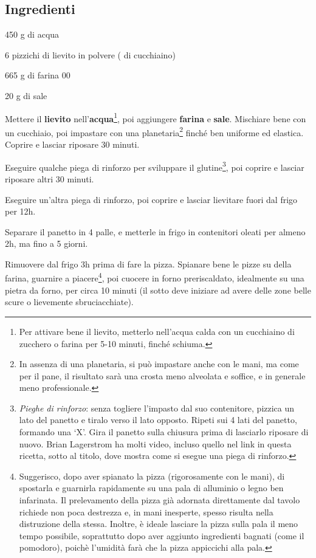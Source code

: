 \newpage
{} \label{pizza_napolitana}

\subsection*{Ingredienti}
\begin{ingredients}
	\item 450 g di acqua
	\item 6 pizzichi di lievito in polvere ( di cucchiaino)
	\item 665 g di farina 00
	\item 20 g di sale
\end{ingredients}


\medskip

Mettere il \textbf{lievito} nell'\textbf{acqua}\footnote{Per attivare bene il lievito, metterlo nell'acqua calda con un cucchiaino di zucchero o farina per 5-10 minuti, finché schiuma.}, poi aggiungere \textbf{farina} e \textbf{sale}. 
Mischiare bene con un cucchiaio, poi impastare con una planetaria\footnote{In assenza di una planetaria, si può impastare anche con le mani, ma come per il pane, il risultato sarà una crosta meno alveolata e soffice, e in generale meno professionale.} finché ben uniforme ed elastica. 
Coprire e lasciar riposare 30 minuti. 

Eseguire qualche piega di rinforzo per sviluppare il glutine\footnote{\textit{Pieghe di rinforzo}: senza togliere l'impasto dal suo contenitore, pizzica un lato del panetto e tiralo verso il lato opposto. Ripeti sui 4 lati del panetto, formando una `X'. Gira il panetto sulla chiusura prima di lasciarlo riposare di nuovo. Brian Lagerstrom ha molti video, incluso quello nel link in questa ricetta, sotto al titolo, dove mostra come si esegue una piega di rinforzo.\label{pieghe_rinforzo}}, poi coprire e lasciar riposare altri 30 minuti.

Eseguire un'altra piega di rinforzo, poi coprire e lasciar lievitare fuori dal frigo per 12h.

Separare il panetto in 4 palle, e metterle in frigo in contenitori oleati per almeno 2h, ma fino a 5 giorni.

Rimuovere dal frigo 3h prima di fare la pizza.
Spianare bene le pizze su della farina, guarnire a piacere\footnote{Suggerisco, dopo aver spianato la pizza (rigorosamente con le mani), di spostarla e guarnirla rapidamente su una pala di alluminio o legno ben infarinata. Il prelevamento della pizza già adornata direttamente dal tavolo richiede non poca destrezza e, in mani inesperte, spesso risulta nella distruzione della stessa. Inoltre, è ideale lasciare la pizza sulla pala il meno tempo possibile, soprattutto dopo aver aggiunto ingredienti bagnati (come il pomodoro), poichè l'umidità farà che la pizza appiccichi alla pala.}, poi cuocere in forno preriscaldato, idealmente su una pietra da forno, per circa 10 minuti (il sotto deve iniziare ad avere delle zone belle scure o lievemente sbruciacchiate). 

